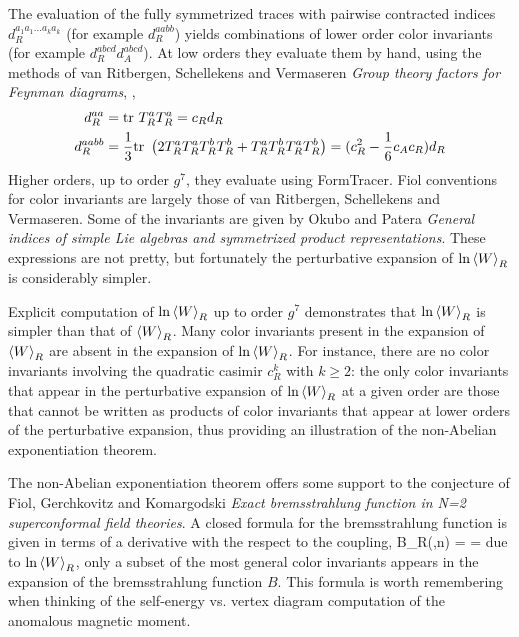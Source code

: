The evaluation of the fully symmetrized traces  with
pairwise contracted indices $d_R^{a_1 a_1\dots a_k a_k}$ (for example
$d_R^{aabb}$) yields combinations of lower order color invariants (for
example $d_R^{abcd}d_A^{abcd}$).
At low orders they evaluate them by hand, using the methods of van
Ritbergen, Schellekens and Vermaseren {\em Group theory factors for
{Feynman} diagrams}, ,
\begin{align*}
d_R^{aa} & = \mbox{\rm tr}\,\,T_R^a T_R^a= c_R d_R \\
d_R^{aabb} & =  \frac{1}{3}\mbox{\rm tr}\,\,
\left(2T_R^aT_R^aT_R^bT_R^b+T_R^aT_R^bT_R^aT_R^b\right)
=(c_R^2-\frac{1}{6}c_A c_R)d_R
\end{align*}
Higher orders, up to order $g^{7}$, they evaluate using
FormTracer.
Fiol \etal{} conventions for color invariants are largely
those of van Ritbergen, Schellekens and Vermaseren.
Some of the invariants are given by Okubo and Patera {\em General indices
of simple {Lie} algebras and symmetrized product
representations}.
These expressions are not pretty, but
fortunately the perturbative expansion of $\ln {\left< {W} \right>}_R$ is considerably
simpler.

Explicit computation of $\ln {\left< {W} \right>}_R$ up to order $g^{7}$ demonstrates
that $\ln {\left< {W} \right>}_R$ is simpler than that of ${\left< {W} \right>}_R$. Many color
invariants present in the expansion of ${\left< {W} \right>}_R$ are absent in the
expansion of $\ln {\left< {W} \right>}_R$. For instance, there are no color invariants
involving the quadratic casimir $c_R^k$ with $k\geq 2$: the only color
invariants that appear in the perturbative expansion of $\ln {\left< {W} \right>}_R$
at a given order are those that cannot be written as products of color
invariants that appear at lower orders of the perturbative expansion,
thus providing an illustration of the non-Abelian exponentiation
theorem.

The non-Abelian exponentiation theorem offers some support to the
conjecture of
Fiol, Gerchkovitz and Komargodski
{\em Exact bremsstrahlung function in {N}=2 superconformal field theories}.
A closed formula for the bremsstrahlung function is given in terms of a
derivative with the respect to the coupling,
\beq
B_R(\lambda,n)
=\lambda {}
= \cdots
{}
due to $\ln {\left< {W} \right>}_R$, only a subset of the most general color
invariants appears in the expansion of the bremsstrahlung function $B$.
This formula is worth remembering when thinking of the self-energy vs.
vertex diagram computation of the anomalous magnetic moment.

